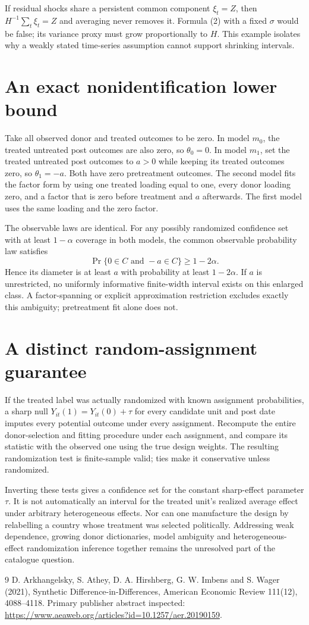 \documentclass[11pt]{article}
\begin{document}
If residual shocks share a persistent common component $\xi_t=Z$, then $H^{-1}\sum_t\xi_t=Z$ and averaging never removes it. Formula (2) with a fixed $\sigma$ would be false; its variance proxy must grow proportionally to $H$. This example isolates why a weakly stated time-series assumption cannot support shrinking intervals.

\section*{An exact nonidentification lower bound}
Take all observed donor and treated outcomes to be zero. In model $m_0$, the treated untreated post outcomes are also zero, so $\theta_0=0$. In model $m_1$, set the treated untreated post outcomes to $a>0$ while keeping its treated outcomes zero, so $\theta_1=-a$. Both have zero pretreatment outcomes. The second model fits the factor form by using one treated loading equal to one, every donor loading zero, and a factor that is zero before treatment and $a$ afterwards. The first model uses the same loading and the zero factor.

The observable laws are identical. For any possibly randomized confidence set with at least $1-\alpha$ coverage in both models, the common observable probability law satisfies
\[
 \Pr\{0\in C\text{ and }-a\in C\}\geq1-2\alpha.
\]
Hence its diameter is at least $a$ with probability at least $1-2\alpha$. If $a$ is unrestricted, no uniformly informative finite-width interval exists on this enlarged class. A factor-spanning or explicit approximation restriction excludes exactly this ambiguity; pretreatment fit alone does not.

\section*{A distinct random-assignment guarantee}
If the treated label was actually randomized with known assignment probabilities, a sharp null $Y_{it}(1)=Y_{it}(0)+\tau$ for every candidate unit and post date imputes every potential outcome under every assignment. Recompute the entire donor-selection and fitting procedure under each assignment, and compare its statistic with the observed one using the true design weights. The resulting randomization test is finite-sample valid; ties make it conservative unless randomized.

Inverting these tests gives a confidence set for the constant sharp-effect parameter $\tau$. It is not automatically an interval for the treated unit's realized average effect under arbitrary heterogeneous effects. Nor can one manufacture the design by relabelling a country whose treatment was selected politically. Addressing weak dependence, growing donor dictionaries, model ambiguity and heterogeneous-effect randomization inference together remains the unresolved part of the catalogue question.
\begin{thebibliography}{9}
 D. Arkhangelsky, S. Athey, D. A. Hirshberg, G. W. Imbens and S. Wager (2021), Synthetic Difference-in-Differences, American Economic Review 111(12), 4088--4118. Primary publisher abstract inspected:
\url{https://www.aeaweb.org/articles?id=10.1257/aer.20190159}.
\end{thebibliography}
\end{document}
